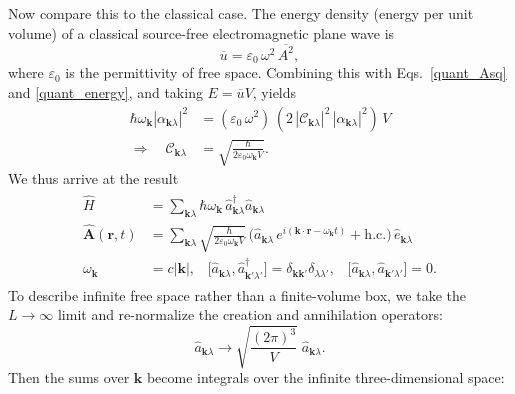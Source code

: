 \documentclass[pra,12pt]{revtex4}
\begin{document}
Now compare this to the classical case.  The energy density (energy
per unit volume) of a classical source-free electromagnetic plane wave
is
\begin{equation}
  \overline{u} = \varepsilon_0\, \omega^2 \, \overline{A^2},
\end{equation}
where $\varepsilon_0$ is the permittivity of free space.  Combining
this with Eqs.~\eqref{quant_Asq} and \eqref{quant_energy}, and taking
$E = \overline{u} V$, yields
\begin{align}
  \hbar\omega_{\mathbf{k}} |\alpha_{\mathbf{k}\lambda}|^2 &=
  \left(\varepsilon_0\, \omega^2\right) \,
  \left(2 \, |\mathcal{C}_{\mathbf{k}\lambda}|^2 \, |\alpha_{\mathbf{k}\lambda}|^2\right)\, V \\
  \Rightarrow \quad \mathcal{C}_{\mathbf{k}\lambda} &= \sqrt{\frac{\hbar}{2\varepsilon_0\omega_{\mathbf{k}}V}}.
\end{align}
We thus arrive at the result
\begin{align}
\boxed{\qquad
  \begin{aligned}
    \hat{H} &= \sum_{\mathbf{k}\lambda} \hbar \omega_{\mathbf{k}} \,
    \hat{a}^\dagger_{\mathbf{k}\lambda} \hat{a}_{\mathbf{k}\lambda} \\
  \hat{\mathbf{A}}(\mathbf{r},t) &= \sum_{\mathbf{k}\lambda} 
  \sqrt{\frac{\hbar}{2\varepsilon_0\omega_{\mathbf{k}}V}}\,
  \Big(\hat{a}_{\mathbf{k}\lambda} \, e^{i(\mathbf{k}\cdot\mathbf{r} - \omega_{\mathbf{k}} t)}
  + \mathrm{h.c.}\Big)\, \hat{e}_{\mathbf{k}\lambda} \\
  \omega_{\mathbf{k}} &= c|\mathbf{k}|,  \;\;\;
  \big[\hat{a}_{\mathbf{k}\lambda}, \hat{a}_{\mathbf{k}'\lambda'}^\dagger\big]
  = \delta_{\mathbf{k}\mathbf{k}'} \delta_{\lambda\lambda'}, \;\;\;
  \big[\hat{a}_{\mathbf{k}\lambda}, \hat{a}_{\mathbf{k}'\lambda'}\big]
  = 0.
  \end{aligned}
  \qquad}
  \label{qed1}
\end{align}
To describe infinite free space rather than a finite-volume box, we
take the $L\rightarrow \infty$ limit and re-normalize the creation and
annihilation operators:
\begin{equation}
  \hat{a}_{\mathbf{k}\lambda} \rightarrow \sqrt{\frac{(2\pi)^3}{V}} \;
  \hat{a}_{\mathbf{k}\lambda}.
\end{equation}
Then the sums over $\mathbf{k}$ become integrals over the infinite
three-dimensional space:
\end{document}
